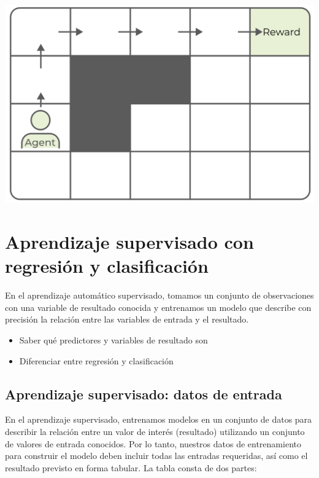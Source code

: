 \documentclass[
]{book}
\providecommand{\tightlist}{%
  \setlength{\itemsep}{0pt}\setlength{\parskip}{0pt}}
\begin{document}
\includegraphics{img/fs.png}

\hypertarget{aprendizaje-supervisado-con-regresiuxf3n-y-clasificaciuxf3n}{%
\section{Aprendizaje supervisado con regresión y clasificación}\label{aprendizaje-supervisado-con-regresiuxf3n-y-clasificaciuxf3n}}

En el aprendizaje automático supervisado, tomamos un conjunto de observaciones con una variable de resultado conocida y entrenamos un modelo que describe con precisión la relación entre las variables de entrada y el resultado.

\begin{itemize}
\tightlist
\item
  Saber qué predictores y variables de resultado son
\item
  Diferenciar entre regresión y clasificación
\end{itemize}

\hypertarget{aprendizaje-supervisado-datos-de-entrada}{%
\subsection{Aprendizaje supervisado: datos de entrada}\label{aprendizaje-supervisado-datos-de-entrada}}

En el aprendizaje supervisado, entrenamos modelos en un conjunto de datos para describir la relación entre un valor de interés (resultado) utilizando un conjunto de valores de entrada conocidos. Por lo tanto, nuestros datos de entrenamiento para construir el modelo deben incluir todas las entradas requeridas, así como el resultado previsto en forma tabular. La tabla consta de dos partes:
\end{document}

